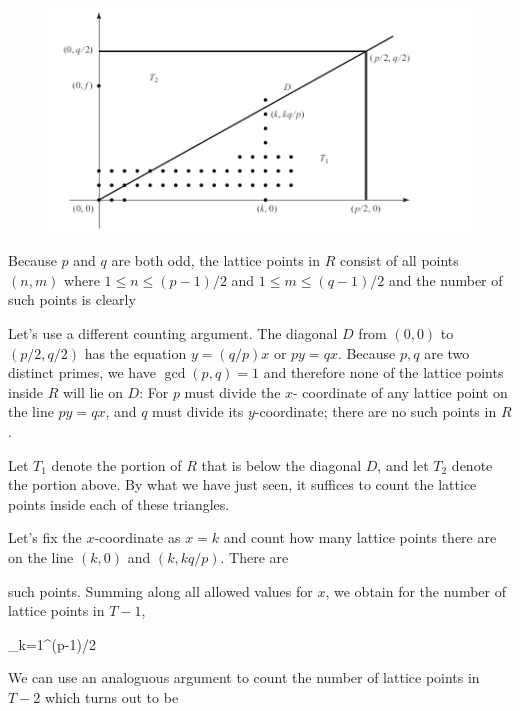 \begin{figure}[H]
    \centering
    \includegraphics[scale=0.75]{images/2023_02_27_quadr_reci_01.png}
\end{figure}

Because $p$ and $q$ are both odd, the lattice points in $R$ consist of all points $(n,m)$ where $1 \leq n \leq (p-1)/2$ and $1 \leq m \leq (q-1)/2$ and the number of such points is clearly

\be\label{2023-02-27:eq1}
 \cdot {}
\ee

Let's use a different counting argument. The diagonal $D$ from $(0,0)$ to $(p/2,q/2)$ has the equation $y = (q/p)x$ or $py = qx$. Because $p, q$ are two distinct primes, we have $\gcd(p,q) = 1$ and therefore none of the lattice points inside $R$ will lie on $D$: For $p$ must divide the $x$- coordinate of any lattice point on the line $py = qx$, and $q$ must divide its $y$-coordinate; there are no such points in $R$.

Let $T_1$ denote the portion of $R$ that is below the diagonal $D$, and let $T_2$ denote the portion above. By what we have just seen, it suffices to count the lattice points inside each of these triangles.

Let's fix the $x$-coordinate as $x=k$ and count how many lattice points there are on the line $(k,0)$ and $(k, kq/p)$. There are 

\bee
{}
\eee

such points. Summing along all allowed values for $x$, we obtain for the number of lattice points in $T-1$,

\be\label{2023-02-27:eq2}
\sum_{k=1}^{(p-1)/2} 
\ee

We can use an analoguous argument to count the number of lattice points in $T-2$ which turns out to be 

